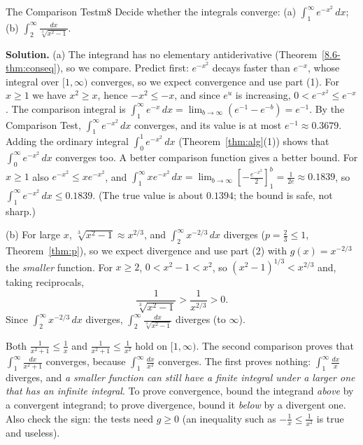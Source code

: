 \documentclass[11pt]{article}
\begin{document}
\begin{exmp}{The Comparison Test}{m8}
Decide whether the integrals converge: (a) $\displaystyle\int_1^\infty e^{-x^2}\,dx$; (b) $\displaystyle\int_2^\infty\frac{dx}{\sqrt[3]{x^2-1}}$.

\textbf{Solution.} (a) The integrand has no elementary antiderivative (Theorem~\ref{8.6-thm:conseq}), so we compare. Predict first: $e^{-x^2}$ decays faster than $e^{-x}$, whose integral over $[1,\infty)$ converges, so we expect convergence and use part (1). For $x\ge1$ we have $x^2\ge x$, hence $-x^2\le-x$, and since $e^u$ is increasing, $0<e^{-x^2}\le e^{-x}$. The comparison integral is $\int_1^\infty e^{-x}\,dx=\lim_{b\to\infty}\left(e^{-1}-e^{-b}\right)=e^{-1}$. By the Comparison Test, $\int_1^\infty e^{-x^2}\,dx$ converges, and its value is at most $e^{-1}\approx0.3679$. Adding the ordinary integral $\int_0^1e^{-x^2}\,dx$ (Theorem~\ref{thm:alg}(1)) shows that $\int_0^\infty e^{-x^2}\,dx$ converges too.
A better comparison function gives a better bound. For $x\ge1$ also $e^{-x^2}\le xe^{-x^2}$, and $\int_1^\infty xe^{-x^2}\,dx=\lim_{b\to\infty}\left[-\frac{e^{-x^2}}2\right]_1^b=\frac1{2e}\approx0.1839$, so $\int_1^\infty e^{-x^2}\,dx\le0.1839$. (The true value is about $0.1394$; the bound is safe, not sharp.)

(b) For large $x$, $\sqrt[3]{x^2-1}\approx x^{2/3}$, and $\int_2^\infty x^{-2/3}\,dx$ diverges ($p=\frac23\le1$, Theorem~\ref{thm:p}), so we expect divergence and use part (2) with $g(x)=x^{-2/3}$ the \emph{smaller} function. For $x\ge2$, $0<x^2-1<x^2$, so $(x^2-1)^{1/3}<x^{2/3}$ and, taking reciprocals,
\[\frac1{\sqrt[3]{x^2-1}}>\frac1{x^{2/3}}>0 .\]
Since $\int_2^\infty x^{-2/3}\,dx$ diverges, $\int_2^\infty\frac{dx}{\sqrt[3]{x^2-1}}$ diverges (to $\infty$).
\end{exmp}

\begin{warn}
Both $\frac1{x^2+1}\le\frac1x$ and $\frac1{x^2+1}\le\frac1{x^2}$ hold on $[1,\infty)$. The second comparison proves that $\int_1^\infty\frac{dx}{x^2+1}$ converges, because $\int_1^\infty\frac{dx}{x^2}$ converges. The first proves nothing: $\int_1^\infty\frac{dx}x$ diverges, and \emph{a smaller function can still have a finite integral under a larger one that has an infinite integral}. To prove convergence, bound the integrand \emph{above} by a convergent integrand; to prove divergence, bound it \emph{below} by a divergent one. Also check the sign: the tests need $g\ge0$ (an inequality such as $-\frac1x\le\frac1{x^2}$ is true and useless).
\end{warn}
\end{document}
